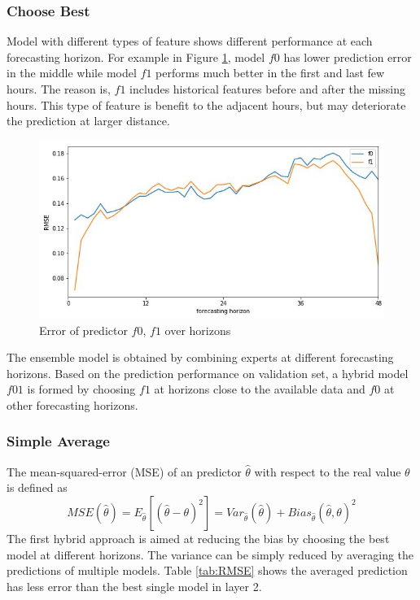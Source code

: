 \documentclass[conference]{IEEEtran}
\begin{document}
\subsubsection{Choose Best}
Model with different types of feature shows different performance at each forecasting horizon. For example in Figure \ref{fig:f0f1}, model $f0$ has lower prediction error in the middle while model $f1$ performs much better in the first and last few hours. The reason is, $f1$ includes historical features before and after the missing hours. This type of feature is benefit to the adjacent hours, but may deteriorate the prediction at larger distance.
\begin{figure}[b]
\centering
\includegraphics[width=0.9\columnwidth]{FIG/f0f1}
\caption{Error of predictor $f0$, $f1$ over horizons}
\label{fig:f0f1}
\end{figure}
The ensemble model is obtained by combining experts at different forecasting horizons. Based on the prediction performance on validation set, a hybrid model $f01$ is formed by choosing $f1$ at horizons close to the available data and $f0$ at other forecasting horizons.

\subsubsection{Simple Average}
The mean-squared-error (MSE) of an predictor $\hat{\theta}$ with respect to the real value $\theta$ is defined as
\begin{equation}
    MSE(\hat{\theta}) = E_{\hat{\theta}}[(\hat{\theta} - \theta)^2] = Var_{\hat{\theta}}(\hat{\theta}) + Bias_{\hat{\theta}}(\hat{\theta}, \theta)^2
\end{equation}
The first hybrid approach is aimed at reducing the bias by choosing the best model at different horizons. The variance can be simply reduced by averaging the predictions of multiple models. Table \ref{tab:RMSE} shows the averaged prediction has less error than the best single model in layer 2.
\end{document}
